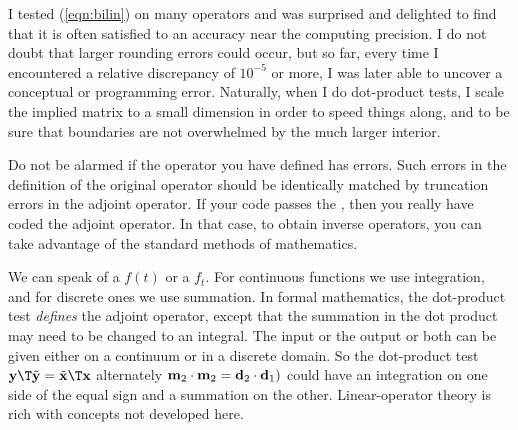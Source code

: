 
\par
I tested (\ref{eqn:bilin}) on many operators
and was surprised and delighted to find
that it is often satisfied to an accuracy near the computing precision.
I do not doubt that larger rounding errors could occur,
but so far,
every time I encountered a relative discrepancy of $10^{-5}$ or more,
I was later able to uncover a conceptual or programming error.
Naturally,
when I do dot-product tests, I scale the implied matrix to a
small dimension in order
to speed things along, and to be sure that
boundaries are not overwhelmed by the much larger interior.

\par
Do not be alarmed if the operator you have defined has  errors.
Such errors in the definition of the original operator
should be identically matched by
truncation errors in the adjoint operator.
If your code passes the ,
then you really have coded the adjoint operator.
In that case,
to obtain inverse operators,
you can take advantage of the standard methods of mathematics.

\par
We can speak of a  $f(t)$
or a  $f_t$.
For continuous functions we use integration,
and for discrete ones we use summation.
In formal mathematics, the dot-product test 
{\em  defines} the adjoint operator,
except that the summation in the dot product
may need to be changed to an integral.
The input or the output or both can be given
either on a continuum or in a discrete domain.
So the dot-product test
$\bold y\T \tilde{\bold y} = \tilde{\bold x}\T \bold x$
alternately
$ \bold m_2 \cdot \bold m_2 = \bold d_2 \cdot \bold d_1) $
could have an integration on one side of the equal sign
and a summation on the other.
Linear-operator theory is rich with concepts not developed here.

